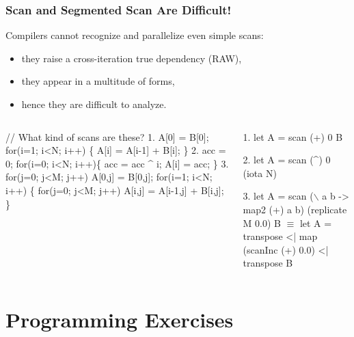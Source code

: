 \documentclass{beamer}
\newcommand{\mymath}[1]{$ #1 $}
\begin{document}
\begin{frame}[fragile,t]
  \frametitle{Scan and Segmented Scan Are Difficult!} 

Compilers cannot recognize and parallelize even simple scans:
\begin{itemize}
    \item they raise a cross-iteration true dependency (RAW),
    \item they appear in a multitude of forms,
    \item hence they are difficult to analyze.
\end  {itemize} 

\begin{columns}
\begin{colorcode}[fontsize=\scriptsize]
// What kind of scans are these?
1. A[0] = B[0];
   for(i=1; i<N; i++) \{
     A[i] = A[i-1] + B[i];
   \}
2. acc = 0;
   for(i=0; i<N; i++)\{
     acc = acc ^ i;
     A[i] = acc;
   \}
3. for(j=0; j<M; j++) 
     A[0,j] = B[0,j];
   for(i=1; i<N; i++) \{
     for(j=0; j<M; j++)
       A[i,j] = A[i-1,j] + B[i,j];
   \}
\end{colorcode}
\pause
\begin{colorcode}[fontsize=\scriptsize]
1. let A = scan (+) 0 B

2. let A = scan (^) 0 (iota N)

3. let A = scan (\mymath{\backslash} a b -> map2 (+) a b) 
                (replicate M 0.0) B 
        \mymath{\equiv}
   let A = transpose <|
           map (scanInc (+) 0.0) <|
           transpose B 
             
\end{colorcode}
\end{columns}
\bigskip

\end{frame}


\section{Programming Exercises}

\begin{frame}
	\tableofcontents[currentsection]
\end{frame}
\end{document}
